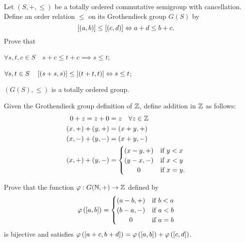 \documentclass[master.tex]{subfiles}
\begin{document}
\begin{exercises}
        \item Let $(S, +, \leq)$ be a totally ordered commutative semigroup with cancellation.
        Define an order relation $\leq$ on its Grothendieck group $G(S)$ by
        \[
            \left[ (a, b) \right] \leq \left[ (c, d) \right] \Leftrightarrow a + d \leq b + c
        .\]
        Prove that
        \begin{exercises}
            \item $\forall s, t, c \in S \quad s + c \leq t + c \implies s \leq t$;
            \item $\forall s,t \in S \quad \left[ (s + s, s) \right] \leq \left[ (t + t, t) \right] \Leftrightarrow s \leq t$;
            \item $(G(S), \leq)$ is a totally ordered group.
        \end{exercises}
        
        \item Given the Grothendieck group definition of $\mathbb{Z}$, define addition in $\mathbb{Z}$ as follows:
        \begin{align*}
            0 + z = z + 0 &= z \quad \forall z \in \Z \\
            (x, +) + (y, +) &= (x + y, +) \\
            (x, -) + (y, -) &= (x + y, -) \\
            (x, +) + (y, -) &=
            \begin{cases}
                (x - y, +) &\text{if } y < x \\
                (y - x, -) &\text{if } x < y \\
                \hfil 0 &\text{if } x = y.
            \end{cases}
        \end{align*}
        \begin{exercises}
            \item Prove that the function $\varphi : G(\mathbb{N}, +) \rightarrow \mathbb{Z}$ defined by
            \[
                \phi\left(\eqclass{a, b}\right) =
                \begin{cases}
                    (a - b, +) &\text{if } b < a \\
                    (b - a, -) &\text{if } a < b \\
                    \hfil 0 &\text{if } a = b
                \end{cases}
            \]
            is bijective and satisfies $\varphi\left(\left[ a + c, b + d \right]\right) = \varphi\left(\left[ a, b \right]\right) + \varphi\left(\left[ c, d \right]\right)$.


\end{exercises}
\end{exercises}
\end{document}
